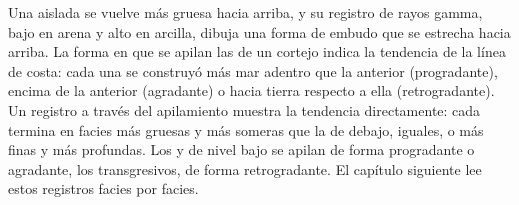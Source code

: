 Una  aislada se vuelve más gruesa hacia arriba, y su registro de rayos gamma, bajo en arena
y alto en arcilla, dibuja una forma de embudo que se estrecha hacia arriba. La forma en que se apilan las
 de un cortejo indica la tendencia de la línea de costa:
cada una se construyó más mar adentro que la anterior (progradante),
encima de la anterior (agradante) o hacia tierra respecto a ella (retrogradante). Un registro
a través del apilamiento muestra la tendencia directamente: cada  termina en
facies más gruesas y más someras que la de debajo, iguales, o más finas y más profundas.
Los  y de nivel bajo se apilan de forma progradante o agradante,
los transgresivos, de forma retrogradante. El capítulo siguiente lee estos registros
facies por facies.

